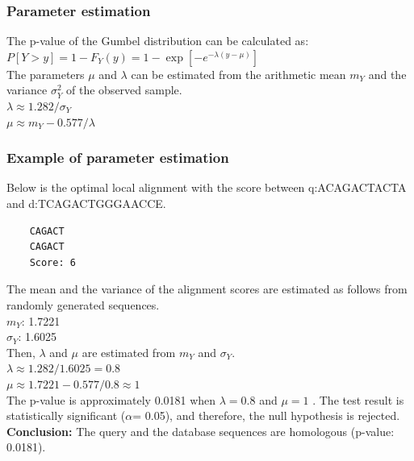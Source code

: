 %
%
\subsubsection*{Parameter estimation}
The p-value of the Gumbel distribution can be calculated as: \\

$P[Y>y]=1-F_Y (y)=1 - \exp [-e^{-\lambda(y-\mu)}]$ \\

\noindent
The parameters $\mu$ and $\lambda$ can be estimated from the arithmetic mean $m_{Y}$ and the variance $\sigma_{Y}^2$ of the observed sample. \\

$\lambda \approx 1.282 / \sigma_{Y}$ \\

$\mu \approx m_{Y} - 0.577/\lambda$

%
%
\subsubsection*{Example of parameter estimation}
Below is the optimal local alignment with the score between q:ACAGACTACTA and  d:TCAGACTGGGAACCE.

\begin{verbatim}
    CAGACT
    CAGACT
    Score: 6
\end{verbatim}

\noindent
The mean and the variance of the alignment scores are estimated as follows from randomly generated sequences. \\

$m_{Y}$: 1.7221 \\

$\sigma_{Y}$: 1.6025 \\

\noindent
Then, $\lambda$ and $\mu$ are estimated from $m_{Y}$ and $\sigma_{Y}$. \\

$\lambda \approx 1.282 / 1.6025 = 0.8$ \\

$\mu \approx 1.7221- 0.577/0.8 \approx 1$  \\

\noindent
The p-value is approximately 0.0181 when $\lambda = 0.8$ and $\mu = 1$ . The test result is statistically significant ($\alpha$= 0.05), and therefore, the null hypothesis is rejected. \\

\noindent
\textbf{Conclusion:} The query and the database sequences are homologous (p-value: 0.0181).

\bigskip 

%
